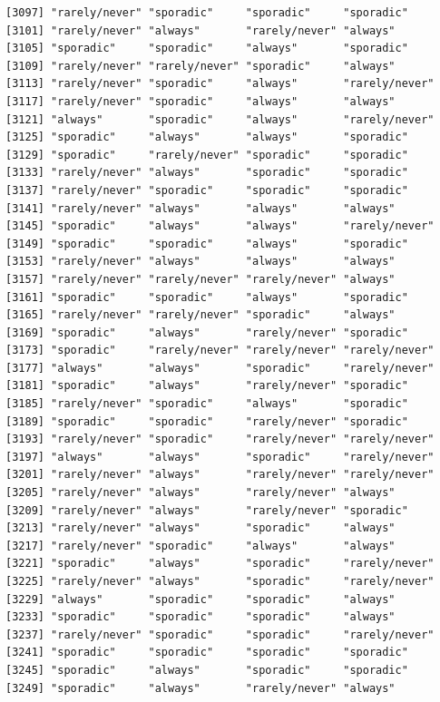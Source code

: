 \documentclass[
  letterpaper,
  DIV=11,
  numbers=noendperiod]{scrartcl}
\begin{document}
\begin{verbatim}
[3097] "rarely/never" "sporadic"     "sporadic"     "sporadic"    
[3101] "rarely/never" "always"       "rarely/never" "always"      
[3105] "sporadic"     "sporadic"     "always"       "sporadic"    
[3109] "rarely/never" "rarely/never" "sporadic"     "always"      
[3113] "rarely/never" "sporadic"     "always"       "rarely/never"
[3117] "rarely/never" "sporadic"     "always"       "always"      
[3121] "always"       "sporadic"     "always"       "rarely/never"
[3125] "sporadic"     "always"       "always"       "sporadic"    
[3129] "sporadic"     "rarely/never" "sporadic"     "sporadic"    
[3133] "rarely/never" "always"       "sporadic"     "sporadic"    
[3137] "rarely/never" "sporadic"     "sporadic"     "sporadic"    
[3141] "rarely/never" "always"       "always"       "always"      
[3145] "sporadic"     "always"       "always"       "rarely/never"
[3149] "sporadic"     "sporadic"     "always"       "sporadic"    
[3153] "rarely/never" "always"       "always"       "always"      
[3157] "rarely/never" "rarely/never" "rarely/never" "always"      
[3161] "sporadic"     "sporadic"     "always"       "sporadic"    
[3165] "rarely/never" "rarely/never" "sporadic"     "always"      
[3169] "sporadic"     "always"       "rarely/never" "sporadic"    
[3173] "sporadic"     "rarely/never" "rarely/never" "rarely/never"
[3177] "always"       "always"       "sporadic"     "rarely/never"
[3181] "sporadic"     "always"       "rarely/never" "sporadic"    
[3185] "rarely/never" "sporadic"     "always"       "sporadic"    
[3189] "sporadic"     "sporadic"     "rarely/never" "sporadic"    
[3193] "rarely/never" "sporadic"     "rarely/never" "rarely/never"
[3197] "always"       "always"       "sporadic"     "rarely/never"
[3201] "rarely/never" "always"       "rarely/never" "rarely/never"
[3205] "rarely/never" "always"       "rarely/never" "always"      
[3209] "rarely/never" "always"       "rarely/never" "sporadic"    
[3213] "rarely/never" "always"       "sporadic"     "always"      
[3217] "rarely/never" "sporadic"     "always"       "always"      
[3221] "sporadic"     "always"       "sporadic"     "rarely/never"
[3225] "rarely/never" "always"       "sporadic"     "rarely/never"
[3229] "always"       "sporadic"     "sporadic"     "always"      
[3233] "sporadic"     "sporadic"     "sporadic"     "always"      
[3237] "rarely/never" "sporadic"     "sporadic"     "rarely/never"
[3241] "sporadic"     "sporadic"     "sporadic"     "sporadic"    
[3245] "sporadic"     "always"       "sporadic"     "sporadic"    
[3249] "sporadic"     "always"       "rarely/never" "always"      

\end{verbatim}
\end{document}
